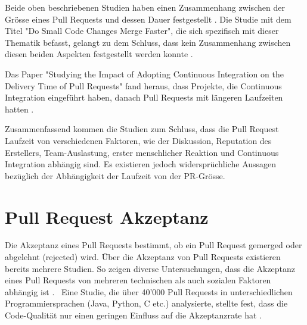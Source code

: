 Beide oben beschriebenen Studien haben einen Zusammenhang zwischen der Grösse eines Pull Requests und dessen Dauer festgestellt \parencite{yu_wait_2015}\parencite{hasan_understanding_2023}. Die Studie mit dem Titel "Do Small Code Changes Merge Faster", die sich spezifisch mit dieser Thematik befasst, gelangt zu dem Schluss, dass kein Zusammenhang zwischen diesen beiden Aspekten festgestellt werden konnte \parencite{kudrjavets_small_2022}.

Das Paper "Studying the Impact of Adopting Continuous Integration on the Delivery Time of Pull Requests" fand heraus, dass Projekte, die Continuous Integration eingeführt haben, danach Pull Requests mit längeren Laufzeiten hatten \parencite{bernardo_studying_2018}.

Zusammenfassend kommen die Studien zum Schluss, dass die Pull Request Laufzeit von verschiedenen Faktoren, wie der Diskussion, Reputation des Erstellers, Team-Auslastung, erster menschlicher Reaktion und Continuous Integration abhängig sind. Es existieren jedoch widersprüchliche Aussagen bezüglich der Abhängigkeit der Laufzeit von der PR-Grösse.



\section{Pull Request Akzeptanz}
Die Akzeptanz eines Pull Requests bestimmt, ob ein Pull Request gemerged oder abgelehnt (rejected) wird. Über die Akzeptanz von Pull Requests existieren bereits mehrere Studien.
So zeigen diverse Untersuchungen, dass die Akzeptanz eines Pull Requests von mehreren technischen als auch sozialen Faktoren abhängig ist \parencite{gousios_exploratory_2014}. \
Eine Studie, die über 40'000 Pull Requests in unterschiedlichen Programmiersprachen (Java, Python, C etc.) analysierte, stellte fest, dass die Code-Qualität nur einen geringen Einfluss auf die Akzeptanzrate hat \parencite{kuhejda_pull_2023}.


